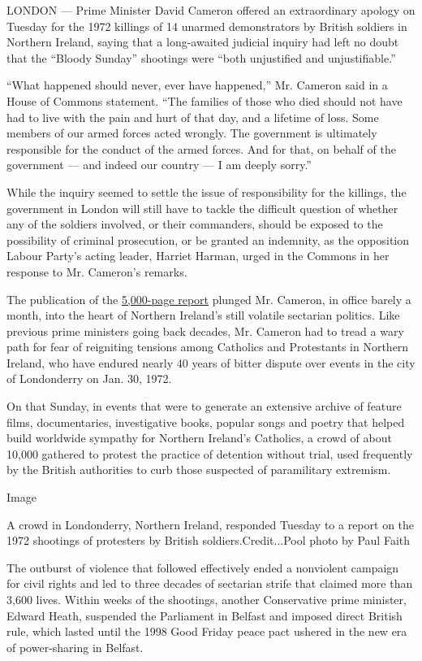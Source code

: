 LONDON --- Prime Minister David Cameron offered an extraordinary apology
on Tuesday for the 1972 killings of 14 unarmed demonstrators by British
soldiers in Northern Ireland, saying that a long-awaited judicial
inquiry had left no doubt that the ``Bloody Sunday'' shootings were
``both unjustified and unjustifiable.''

``What happened should never, ever have happened,'' Mr. Cameron said in
a House of Commons statement. ``The families of those who died should
not have had to live with the pain and hurt of that day, and a lifetime
of loss. Some members of our armed forces acted wrongly. The government
is ultimately responsible for the conduct of the armed forces. And for
that, on behalf of the government --- and indeed our country --- I am
deeply sorry.''

While the inquiry seemed to settle the issue of responsibility for the
killings, the government in London will still have to tackle the
difficult question of whether any of the soldiers involved, or their
commanders, should be exposed to the possibility of criminal
prosecution, or be granted an indemnity, as the opposition Labour
Party's acting leader, Harriet Harman, urged in the Commons in her
response to Mr. Cameron's remarks.

The publication of the
\href{http://report.bloody-sunday-inquiry.org/}{5,000-page report}
plunged Mr. Cameron, in office barely a month, into the heart of
Northern Ireland's still volatile sectarian politics. Like previous
prime ministers going back decades, Mr. Cameron had to tread a wary path
for fear of reigniting tensions among Catholics and Protestants in
Northern Ireland, who have endured nearly 40 years of bitter dispute
over events in the city of Londonderry on Jan. 30, 1972.

On that Sunday, in events that were to generate an extensive archive of
feature films, documentaries, investigative books, popular songs and
poetry that helped build worldwide sympathy for Northern Ireland's
Catholics, a crowd of about 10,000 gathered to protest the practice of
detention without trial, used frequently by the British authorities to
curb those suspected of paramilitary extremism.

Image

A crowd in Londonderry, Northern Ireland, responded Tuesday to a report
on the 1972 shootings of protesters by British soldiers.Credit...Pool
photo by Paul Faith

The outburst of violence that followed effectively ended a nonviolent
campaign for civil rights and led to three decades of sectarian strife
that claimed more than 3,600 lives. Within weeks of the shootings,
another Conservative prime minister, Edward Heath, suspended the
Parliament in Belfast and imposed direct British rule, which lasted
until the 1998 Good Friday peace pact ushered in the new era of
power-sharing in Belfast.


